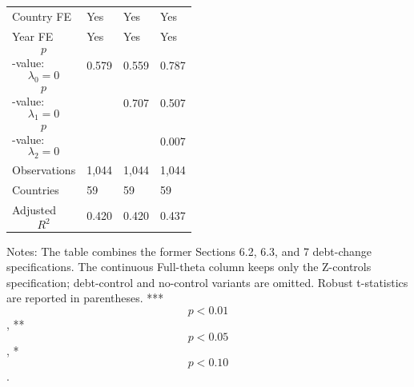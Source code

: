 \begin{table}[H]
\begin{threeparttable}
\begin{tabularx}{\textwidth}{lYYY}
Country FE & Yes & Yes & Yes \\
Year FE & Yes & Yes & Yes \\
$$p$$-value: $$\lambda_0=0$$ & 0.579 & 0.559 & 0.787 \\
$$p$$-value: $$\lambda_1=0$$ &  & 0.707 & 0.507 \\
$$p$$-value: $$\lambda_2=0$$ &  &  & 0.007 \\
Observations & 1,044 & 1,044 & 1,044 \\
Countries & 59 & 59 & 59 \\
Adjusted $$R^2$$ & 0.420 & 0.420 & 0.437 \\
\bottomrule
\end{tabularx}
\begin{tablenotes}[flushleft]\footnotesize
\item Notes: The table combines the former Sections 6.2, 6.3, and 7 debt-change specifications. The continuous Full-theta column keeps only the Z-controls specification; debt-control and no-control variants are omitted. Robust t-statistics are reported in parentheses. *** $$p<0.01$$, ** $$p<0.05$$, * $$p<0.10$$.
\end{tablenotes}
\end{threeparttable}
\end{table}

